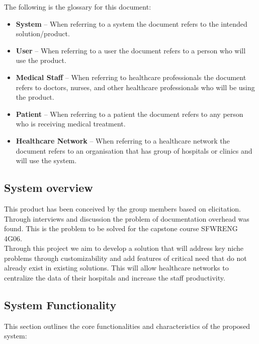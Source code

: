 \documentclass[12pt]{article}
\begin{document}
The following is the glossary for this document:

\begin{itemize}
  \item \textbf{System} -- When referring to a system the document refers to the intended solution/product.
  \item \textbf{User} -- When referring to a user the document refers to a person who will use the product.
  \item \textbf{Medical Staff} -- When referring to healthcare professionals the document refers to doctors, nurses, and other healthcare professionals who will be using the product.
  \item \textbf{Patient} -- When referring to a patient the document refers to any person who is receiving medical treatment.
  \item \textbf{Healthcare Network} -- When referring to a healthcare network the document refers to an organisation that has group of hospitals or clinics and will use the system.

\end{itemize}


\subsection{System overview} \label{sec_SystemOverview}

This product has been conceived by the group members based on elicitation. Through interviews and discussion the problem of documentation overhead was found. This is the problem to be solved for the capstone course SFWRENG 4G06.\\

Through this project we aim to develop a solution that will address key niche problems through customizability and add features of critical need that do not already exist in existing solutions. This will allow healthcare networks to centralize the data of their hospitals and increase the staff productivity.

\subsection{System Functionality} \label{sec_SystemFunctionality}

This section outlines the core functionalities and characteristics of the proposed system:
\end{document}
